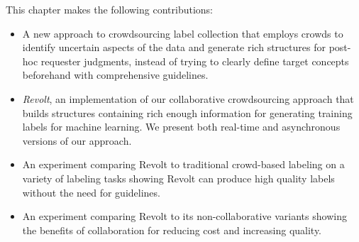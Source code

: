 This chapter makes the following contributions:
\begin{itemize}  
\setlength\itemsep{-0.26em}
\item A new approach to crowdsourcing label collection that employs crowds to identify uncertain aspects of the data and generate rich structures for post-hoc requester judgments, instead of trying to clearly define target concepts beforehand with comprehensive guidelines.
\item \emph{Revolt}, an implementation of our collaborative crowdsourcing approach that builds structures containing rich enough information for generating training labels for machine learning. We present both real-time and asynchronous versions of our approach. %
\item An experiment comparing Revolt to traditional crowd-based labeling on a variety of labeling tasks showing Revolt can produce high quality labels without the need for guidelines. 
\item An experiment comparing Revolt to its non-collaborative variants showing the benefits of collaboration for reducing cost and increasing quality.

\end{itemize}

